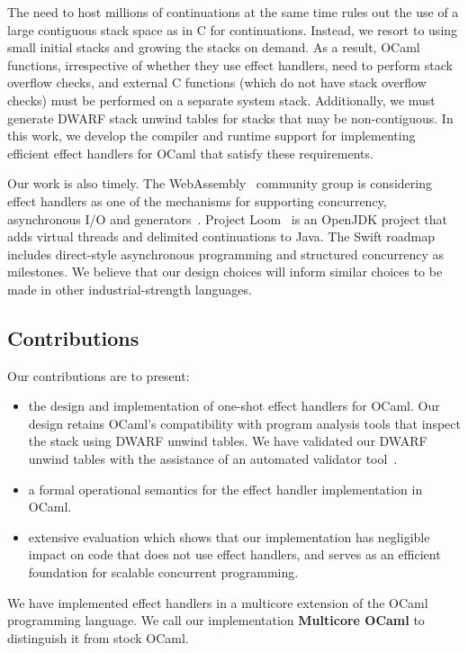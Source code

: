 \documentclass[sigplan,10pt,review,anonymous]{acmart}\settopmatter{printfolios=true,printccs=false,printacmref=false}
\begin{document}
The need to host millions of continuations at the same time rules out the use
of a large contiguous stack space as in C for continuations. Instead, we resort
to using small initial stacks and growing the stacks on demand. As a result,
OCaml functions, irrespective of whether they use effect handlers, need to
perform stack overflow checks, and external C functions (which do not have stack
overflow checks) must be performed on a separate system stack. Additionally, we
must generate DWARF stack unwind tables for stacks that may be non-contiguous.
In this work, we develop the compiler and runtime support for implementing
efficient effect handlers for OCaml that satisfy these requirements.

Our work is also timely. The WebAssembly~\cite{Hass17} community group is
considering effect handlers as one of the mechanisms for supporting
concurrency, asynchronous I/O and generators~\cite{WasmProposal}. Project
Loom~\cite{loom} is an OpenJDK project that adds virtual threads and delimited
continuations to Java. The Swift roadmap~\cite{swift} includes direct-style
asynchronous programming and structured concurrency as milestones. We believe
that our design choices will inform similar choices to be made in other
industrial-strength languages.

\subsection{Contributions}

Our contributions are to present:

\begin{itemize}
  \item the design and implementation of one-shot effect handlers for OCaml.
    Our design retains OCaml's compatibility with program analysis tools that
    inspect the stack using DWARF unwind tables. We have validated our DWARF
    unwind tables with the assistance of an automated validator
    tool~\cite{Bastian19}.
  \item a formal operational semantics for the effect handler implementation in
    OCaml.
	\item extensive evaluation which shows that our implementation has negligible
		impact on code that does not use effect handlers, and serves as an
		efficient foundation for scalable concurrent programming.
\end{itemize}

We have implemented effect handlers in a multicore extension of the OCaml
programming language. We call our implementation \textbf{Multicore OCaml} to
distinguish it from stock OCaml.
\end{document}

